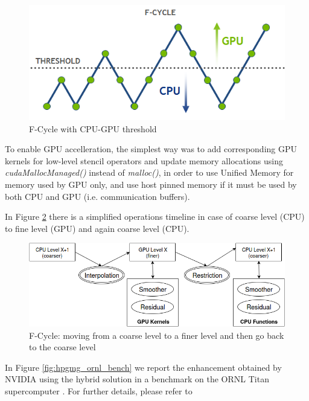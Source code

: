 \documentclass[conference]{IEEEtran}
\begin{document}
\begin{figure}[h]
\includegraphics[scale=0.6]{hpgmg_f_cycle.png}
\caption{F-Cycle with CPU-GPU threshold}
\label{fig:hpgmg_fcycle}
\end{figure}
 
To enable GPU accelleration, the simplest way was to add corresponding GPU kernels for low-level stencil operators and update memory allocations using \textit{cudaMallocManaged()} instead of \textit{malloc()}, in order to use Unified Memory \cite{unifiedmemory} for memory used by GPU only, and use host pinned memory if it must be used by both CPU and GPU (i.e. communication buffers).

In Figure \ref{fig:hpgmg_levels} there is a simplified operations timeline in case of coarse level (CPU) to fine level (GPU) and again coarse level (CPU).

\begin{figure}[h]
\includegraphics[scale=0.35]{hpgmg_levels.png}
\caption{F-Cycle: moving from a coarse level to a finer level and then go back to the coarse level}
\label{fig:hpgmg_levels}
\end{figure}

In Figure \ref{fig:hpgmg_ornl_bench} we report the enhancement obtained by NVIDIA using the hybrid solution in a benchmark on the ORNL Titan supercomputer \cite{ornl}. For further details, please refer to \cite{HPGMG_NVIDIA}
\end{document}
